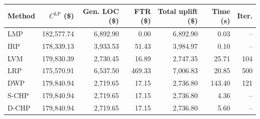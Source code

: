 \begin{tabular}{lrrrrrr}
\toprule
Method & $C^{\mathrm{LP}}$ (\$) & Gen. LOC (\$) & FTR (\$) & Total uplift (\$) & Time (s) & Iter. \\
\midrule
LMP & 182,577.74 & 6,892.90 & 0.00 & 6,892.90 & 0.03 & -- \\
IRP & 178,339.13 & 3,933.53 & 51.43 & 3,984.97 & 0.10 & -- \\
LVM & 179,830.39 & 2,730.45 & 16.89 & 2,747.35 & 25.71 & 104 \\
LRP & 175,570.91 & 6,537.50 & 469.33 & 7,006.83 & 20.85 & 500 \\
DWP & 179,840.94 & 2,719.65 & 17.15 & 2,736.80 & 143.40 & 121 \\
S-CHP & 179,840.94 & 2,719.65 & 17.15 & 2,736.80 & 4.36 & -- \\
D-CHP & 179,840.94 & 2,719.65 & 17.15 & 2,736.80 & 5.60 & -- \\
\bottomrule
\end{tabular}
